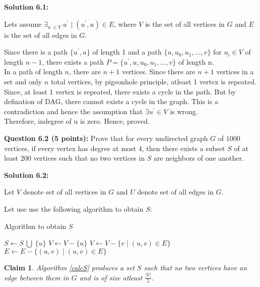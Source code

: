 \documentclass[11pt]{article}
\newtheorem{claim}[theorem]{Claim}
\begin{document}
\textbf{Solution 6.1:}

Lets assume $\exists_{u^{\prime} \in V}\ u^{\prime} \mid
(u^{\prime}, u) \in E$, where $V$ is the set of all vertices in $G$ 
and $E$ is the set of all edges in $G$.

Since there is a path $\{u^{\prime}, u\}$ of length 1 and a path 
$\{u, u_0, u_1, \dots, v\}$ for $u_i \in V$ of length $n - 1$, there exists
a path $P = \{u^{\prime}, u, u_0, u_1, \dots, v\}$ of length n.\\

In a path of length $n$, there are $n + 1$ vertices. Since there are $n + 1$
vertices in a set and only $n$ total vertices, by pigeonhole principle, atleast
1 vertex is repeated.\\

Since, at least 1 vertex is repeated, there exists a cycle in the path. But by
defination of DAG, there cannot exists a cycle in the graph. This is a
contradiction and hence the assumption that $\exists u^{\prime} \in V$
is wrong.\\

Therefore, indegree of u is zero. Hence, proved.

\textbf{Question 6.2 (5 points):} Prove that for every undirected graph
\(G\) of \(1000\) vertices, if every vertex has degree at most \(4\),
then there exists a subset \(S\) of at least \(200\) vertices such that
no two vertices in \(S\) are neighbors of one another.

\textbf{Solution 6.2:}

Let $V$ denote set of all vertices in $G$ and $U$ denote set of all edges
in $G$.

Let use use the following algorithm to obtain $S$:

\begin{algorithm}
    \caption{Algorithm to obtain $S$}
    \label{calcS}
    \begin{algorithmic}
        \STATE $S \leftarrow S\ \bigcup\ \{u\}$
        \STATE $V \leftarrow V - \{u\}$
        \STATE $V \leftarrow V - \{v \mid (u, v) \in E\}$
        \STATE $E \leftarrow E - \{(u, v) \mid (u, v) \in E\}$
        \ENDWHILE
    \end{algorithmic}
\end{algorithm}

\begin{claim}
    \label{6.2claim}
    Algorithm \ref{calcS} produces a set $S$ such that no two vertices have an
    edge between them in $G$ and is of size atleast $\frac{|V|}{5}$.
\end{claim}
\end{document}

